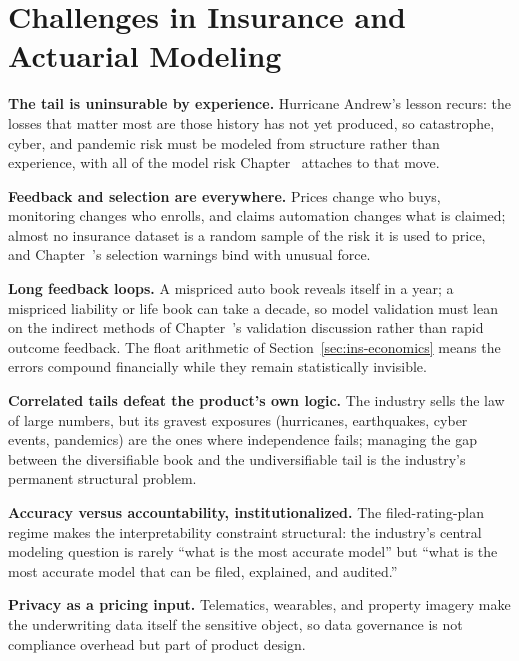 \documentclass[../ai_in_finance]{subfiles}
\begin{document}
\section{Challenges in Insurance and Actuarial Modeling}

\textbf{The tail is uninsurable by experience.} Hurricane Andrew's lesson recurs: the losses that matter most are those history has not yet produced, so catastrophe, cyber, and pandemic risk must be modeled from structure rather than experience, with all of the model risk Chapter~ attaches to that move.

\textbf{Feedback and selection are everywhere.} Prices change who buys, monitoring changes who enrolls, and claims automation changes what is claimed; almost no insurance dataset is a random sample of the risk it is used to price, and Chapter~'s selection warnings bind with unusual force.

\textbf{Long feedback loops.} A mispriced auto book reveals itself in a year; a mispriced liability or life book can take a decade, so model validation must lean on the indirect methods of Chapter~'s validation discussion rather than rapid outcome feedback. The float arithmetic of Section~\ref{sec:ins-economics} means the errors compound financially while they remain statistically invisible.

\textbf{Correlated tails defeat the product's own logic.} The industry sells the law of large numbers, but its gravest exposures (hurricanes, earthquakes, cyber events, pandemics) are the ones where independence fails; managing the gap between the diversifiable book and the undiversifiable tail is the industry's permanent structural problem.

\textbf{Accuracy versus accountability, institutionalized.} The filed-rating-plan regime makes the interpretability constraint structural: the industry's central modeling question is rarely ``what is the most accurate model'' but ``what is the most accurate model that can be filed, explained, and audited.''

\textbf{Privacy as a pricing input.} Telematics, wearables, and property imagery make the underwriting data itself the sensitive object, so data governance is not compliance overhead but part of product design.

\end{document}
